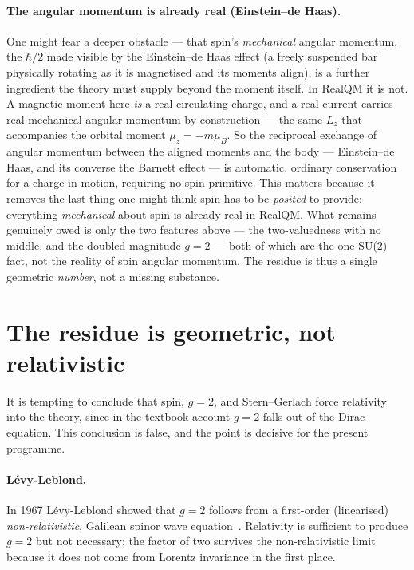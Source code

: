 \documentclass[11pt]{article}
\begin{document}
\paragraph{The angular momentum is already real (Einstein--de Haas).} One might fear a deeper obstacle --- that
spin's \emph{mechanical} angular momentum, the $\hbar/2$ made visible by the Einstein--de Haas effect (a freely
suspended bar physically rotating as it is magnetised and its moments align), is a further ingredient the theory
must supply beyond the moment itself. In RealQM it is not. A magnetic moment here \emph{is} a real circulating
charge, and a real current carries real mechanical angular momentum by construction --- the same $L_z$ that
accompanies the orbital moment $\mu_z=-m\mu_B$. So the reciprocal exchange of angular momentum between
the aligned moments and the body --- Einstein--de Haas, and its converse the Barnett effect --- is automatic,
ordinary conservation for a charge in motion, requiring no spin primitive. This matters because it removes the
last thing one might think spin has to be \emph{posited} to provide: everything \emph{mechanical} about spin is
already real in RealQM. What remains genuinely owed is only the two features above --- the two-valuedness with no
middle, and the doubled magnitude $g=2$ --- both of which are the one SU(2) fact, not the reality of spin angular
momentum. The residue is thus a single geometric \emph{number}, not a missing substance.

\section{The residue is geometric, not relativistic}
\label{sec:geom}

It is tempting to conclude that spin, $g=2$, and Stern--Gerlach force relativity into the theory, since in
the textbook account $g=2$ falls out of the Dirac equation. This conclusion is false, and the point is
decisive for the present programme.

\paragraph{Lévy-Leblond.} In 1967 Lévy-Leblond showed that $g=2$ follows from a first-order (linearised)
\emph{non-relativistic}, Galilean spinor wave equation~\cite{LevyLeblond}. Relativity is sufficient to
produce $g=2$ but not necessary; the factor of two survives the non-relativistic limit because it does not
come from Lorentz invariance in the first place.
\end{document}
